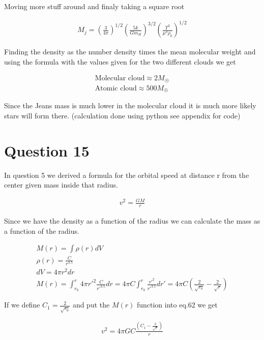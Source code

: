 \documentclass[a4paper]{article}
\begin{document}
Moving more stuff around and finaly taking a square root

\begin{align}
    M_j = \left (\frac{3}{4\pi} \right )^{1/2} \left (\frac{5k}{Gm_H} \right )^{3/2} \left (\frac{T^3}{\mu^3 \rho_0}\right )^{1/2}
\end{align}

Finding the density as the number density times the mean molecular weight and using the formula with the values given for the two different clouds we get

\begin{align}
    \text{Molecular cloud} \approx 2 M_{\Sun}\\
    \text{Atomic cloud} \approx 500 M_{\Sun}
\end{align}

Since the Jeans mass is much lower in the molecular cloud it is much more likely stars will form there. (calculation done using python see appendix for code) 

\pagebreak

\section*{Question 15}

In question 5 we derived a formula for the orbital speed at distance r from the center given mass inside that radius.

\begin{align}
    v^2 = \frac{GM}{r}
\end{align}

Since we have the density as a function of the radius we can calculate the mass as a function of the radius.

\begin{align}
    M(r) = \int \rho(r) dV \\
    \rho(r) = \frac{C}{r^{3.5}} \\
    dV = 4\pi r^2 dr \\
    M(r) = \int_{r_0}^r  4\pi r'^2 \frac{C}{r'^{3.5}} dr = 4\pi C \int_{r_0}^r  \frac{r'^2}{r'^{3.5}} dr' = 4\pi C \left ( \frac{2}{\sqrt{r_0}} - \frac{2}{\sqrt{r}}\right )
\end{align}

If we define $C_1 = \frac{2}{\sqrt{r_0}}$ and put the $M(r)$ function into eq.62 we get

\begin{align}
    v^2 = 4\pi GC \frac{\left (C_1 - \frac{2}{\sqrt{r}}\right )}{r}
\end{align}
\end{document}
